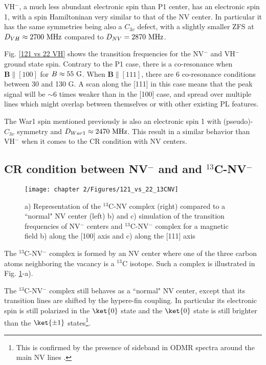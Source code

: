 \documentclass[a4paper, 11pt]{book}
\begin{document}
VH$^-$, a much less abundant electronic spin than P1 center, has an electronic spin 1, with a spin Hamiltoninan very similar to that of the NV center. In particular it has the same symmetries being also a $C_{3v}$ defect, with a slightly smaller ZFS at $D_{VH} \approx 2700\ \rm MHz$ compared to $D_{NV}=2870\ \rm MHz$. 

Fig. \ref{121 vs 22 VH} shows the transition frequencies for the NV$^-$ and VH$^-$ ground state spin. Contrary to the P1 case, there is a co-resonance when $\mathbf{B} \parallel [100]$ for $B\approx 55\ \rm G$. When $\mathbf{B} \parallel [111]$, there are 6 co-resonance conditions between 30 and 130 G. A scan along the [111] in this case means that the peak signal will be $\sim 6$ times weaker than in the [100] case, and spread over multiple lines which might overlap between themselves or with other existing PL features.

The War1 spin mentioned previously is also an electronic spin 1 with (pseudo)-$C_{3v}$ symmetry and $D_{War1} \approx 2470\ \rm MHz$. This result in a similar behavior than VH$^-$ when it comes to the CR condition with NV centers.

\subsection{CR condition between NV$^-$ and and $^{13}$C-NV$^-$}

\begin{figure}[h]
\centering
\texttt{[image: chapter 2/Figures/121\_vs\_22\_13CNV]}
\caption{a) Representation of the $^{13}$C-NV complex (right) compared to a ``normal" NV center (left) b) and c) simulation of the transition frequencies of NV$^-$ centers and $^{13}$C-NV$^-$ complex for a magnetic field b) along the [100] axis and c) along the [111] axis}
\label{121 vs 22 13C-NV}
\end{figure}

The $^{13}$C-NV$^-$ complex is formed by an NV center where one of the three carbon atoms neighboring the vacancy is a $^{13}$C isotope. Such a complex is illustrated in Fig. \ref{121 vs 22 13C-NV}-a).

The $^{13}$C-NV$^-$ complex still behaves as a ``normal" NV center, except that its transition lines are shifted by the hypere-fin coupling. In particular its electronic spin is still polarized in the $\ket{0}$ state and the $\ket{0}$ state is still brighter than the $\ket{\pm 1}$ states\footnote{This is confirmed by the presence of sideband in ODMR spectra around the main NV lines \citep{simanovskaia2013sidebands}.}. 
\end{document}
